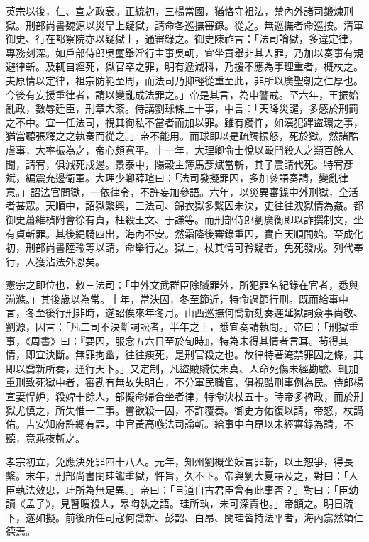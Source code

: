 英宗以後，仁、宣之政衰。正統初，三楊當國，猶恪守祖法，禁內外諸司鍛煉刑獄。刑部尚書魏源以災旱上疑獄，請命各巡撫審錄。從之。無巡撫者命巡按。清軍御史、行在都察院亦以疑獄上，通審錄之。御史陳祚言：「法司論獄，多違定律，專務刻深。如戶部侍郎吳璽舉淫行主事吳軏，宜坐貢舉非其人罪，乃加以奏事有規避律斬。及軏自經死，獄官卒之罪，明有遞減科，乃援不應為事理重者，概杖之。夫原情以定律，祖宗防範至周，而法司乃抑輕從重至此，非所以廣聖朝之仁厚也。今後有妄援重律者，請以變亂成法罪之。」帝是其言，為申警戒。至六年，王振始亂政，數辱廷臣，刑章大紊。侍講劉球條上十事，中言：「天降災譴，多感於刑罰之不中。宜一任法司，視其徇私不當者而加以罪。雖有觸忤，如漢犯蹕盜環之事，猶當聽張釋之之執奏而從之。」帝不能用。而球即以是疏觸振怒，死於獄。然諸酷虐事，大率振為之，帝心頗寬平。十一年，大理卿俞士悅以毆鬥殺人之類百餘人聞，請宥，俱減死戍邊。景泰中，陽穀主簿馬彥斌當斬，其子震請代死。特宥彥斌，編震充邊衛軍。大理少卿薛瑄曰：「法司發擬罪囚，多加參語奏請，變亂律意。」詔法官問獄，一依律令，不許妄加參語。六年，以災異審錄中外刑獄，全活者甚眾。天順中，詔獄繁興，三法司、錦衣獄多繫囚未決，吏往往洩獄情為姦。都御史蕭維楨附會徐有貞，枉殺王文、于謙等。而刑部侍郎劉廣衡即以詐撰制文，坐有貞斬罪。其後緹騎四出，海內不安。然霜降後審錄重囚，實自天順間始。至成化初，刑部尚書陸瑜等以請，命舉行之。獄上，杖其情可矜疑者，免死發戍。列代奉行，人獲沾法外恩矣。

憲宗之即位也，敕三法司：「中外文武群臣除贓罪外，所犯罪名紀錄在官者，悉與湔滌。」其後歲以為常。十年，當決囚，冬至節近，特命過節行刑。既而給事中言，冬至後行刑非時，遂詔俟來年冬月。山西巡撫何喬新劾奏遲延獄詞僉事尚敬、劉源，因言：「凡二司不決斷詞訟者，半年之上，悉宜奏請執問。」帝曰：「刑獄重事，《周書》曰：『要囚，服念五六日至於旬時』，特為未得其情者言耳。茍得其情，即宜決斷。無罪拘幽，往往瘐死，是刑官殺之也。故律特著淹禁罪囚之條，其即以喬新所奏，通行天下。」又定制，凡盜賊贓仗未真、人命死傷未經勘驗、輒加重刑致死獄中者，審勘有無故失明白，不分軍民職官，俱視酷刑事例為民。侍郎楊宣妻悍妒，殺婢十餘人，部擬命婦合坐者律，特命決杖五十。時帝多裨政，而於刑獄尤慎之，所失惟一二事。嘗欲殺一囚，不許覆奏。御史方佑復以請，帝怒，杖謫佑。吉安知府許總有罪，中官黃高嗾法司論斬。給事中白昂以未經審錄為請，不聽，竟乘夜斬之。

孝宗初立，免應決死罪四十八人。元年，知州劉概坐妖言罪斬，以王恕爭，得長繫。末年，刑部尚書閔珪讞重獄，忤旨，久不下。帝與劉大夏語及之，對曰：「人臣執法效忠，珪所為無足異。」帝曰：「且道自古君臣曾有此事否？」對曰：「臣幼讀《孟子》，見瞽瞍殺人，皋陶執之語。珪所執，未可深責也。」帝頷之。明日疏下，遂如擬。前後所任司寇何喬新、彭韶、白昂、閔珪皆持法平者，海內翕然頌仁德焉。

